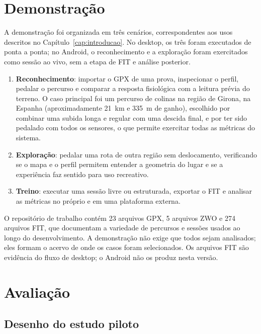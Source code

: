 \section{Demonstração}
\label{sec:demonstracao}

A demonstração foi organizada em três cenários, correspondentes aos usos
descritos no Capítulo~\ref{cap:introducao}. No desktop, os três foram
executados de ponta a ponta; no Android, o reconhecimento e a exploração foram
exercitados como sessão ao vivo, sem a etapa de FIT e análise posterior.

\begin{enumerate}
    \item \textbf{Reconhecimento}: importar o GPX de uma prova, inspecionar o
        perfil, pedalar o percurso e comparar a resposta fisiológica com a
        leitura prévia do terreno. O caso principal foi um percurso de colinas
        na região de Girona, na Espanha (aproximadamente 21~km e 335~m de
        ganho), escolhido por combinar uma subida longa e regular com uma
        descida final, e por ter sido pedalado com todos os sensores, o que
        permite exercitar todas as métricas do sistema.
    \item \textbf{Exploração}: pedalar uma rota de outra região sem deslocamento,
        verificando se o mapa e o perfil permitem entender a geometria do lugar
        e se a experiência faz sentido para uso recreativo.
    \item \textbf{Treino}: executar uma sessão livre ou estruturada, exportar o
        FIT e analisar as métricas no próprio \argus{} e em uma plataforma
        externa.
\end{enumerate}

O repositório de trabalho contém 23 arquivos GPX, 5 arquivos ZWO e 274 arquivos
FIT, que documentam a variedade de percursos e sessões usados ao longo do
desenvolvimento. A demonstração não exige que todos sejam analisados; eles
formam o acervo de onde os casos foram selecionados. Os arquivos FIT são
evidência do fluxo de desktop; o Android não os produz nesta versão.

\section{Avaliação}
\label{sec:avaliacao}

\subsection{Desenho do estudo piloto}
\label{sec:desenho-piloto}

